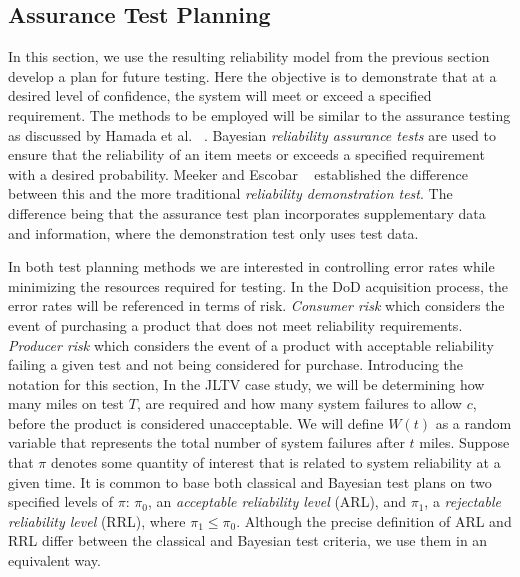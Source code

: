 \documentclass[12pt]{article}
\begin{document}
\subsection{Assurance Test Planning}
In this section, we use the resulting reliability model from the previous
section develop a plan for future testing.  Here the objective is to demonstrate
that at a desired level of confidence, the system will meet or exceed a
specified requirement. The methods to be employed will be similar to the
assurance testing as discussed by Hamada et al. ~\cite{ref4}. Bayesian
\emph{reliability assurance tests} are used to ensure that the reliability of
an item meets or exceeds a specified requirement with a desired probability.
Meeker and Escobar ~\cite{ME04} established the difference between this and the
more traditional \emph{reliability demonstration test}.  The difference being
that the assurance test plan incorporates supplementary data and information,
where the demonstration test only uses test data.

In both test planning methods we are interested in controlling error rates while
minimizing the resources required for testing.  In the DoD acquisition process,
the error rates will be referenced in terms of risk. \emph{Consumer risk} which
considers the event of purchasing a product that does not meet reliability
requirements.  \emph{Producer risk} which considers the event of a product with
acceptable reliability failing a given test and not being considered for
purchase.  Introducing the notation for this section, In the JLTV case study, we
will be determining how many miles on test $T$, are required and how many system
failures to allow $c$, before the product is considered unacceptable.  We will
define $W(t)$ as a random variable that represents the total number of system
failures after $t$ miles.  Suppose that $\pi$ denotes some quantity of interest
that is related to system reliability at a given time. It is common to base both
classical and Bayesian test plans on two specified levels of $\pi$: $\pi_0$, an
\emph{acceptable reliability level} (ARL), and $\pi_1$, a \emph{rejectable
reliability level} (RRL), where $\pi_1 \leq  \pi_0$. Although the precise
definition of ARL and RRL differ between the classical and Bayesian test
criteria, we use them in an equivalent way.
\end{document}
